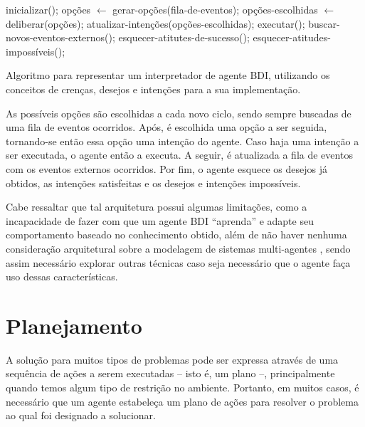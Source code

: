 \begin{algorithm}[htb] \begin{center}
	\begin{algorithmic}[1] \STATE inicializar(); \STATE {} \STATE
	opções $\gets$ gerar-opções(fila-de-eventos); \STATE opções-escolhidas
	$\gets$ deliberar(opções); \STATE atualizar-intenções(opções-escolhidas);
	\STATE executar(); \STATE buscar-novos-eventos-externos(); \STATE
	esquecer-atitutes-de-sucesso(); \STATE esquecer-atitudes-impossíveis();
	\ENDWHILE \end{algorithmic} \end{center} \caption[Algoritmo para representar
	um interpretador de agente BDI.] {\label{alg:BDIINTERPRETERALG} Algoritmo
	para representar um interpretador de agente BDI, utilizando os conceitos de
	crenças, desejos e intenções para a sua implementação.} \end{algorithm}

As possíveis opções são escolhidas a cada novo ciclo, sendo sempre buscadas de
uma fila de eventos ocorridos. Após, é escolhida uma opção a ser seguida,
tornando-se então essa opção uma intenção do agente. Caso haja uma intenção a
ser executada, o agente então a executa. A seguir, é atualizada a fila de
eventos com os eventos externos ocorridos. Por fim, o agente esquece os desejos
já obtidos, as intenções satisfeitas e os desejos e intenções impossíveis.

Cabe ressaltar que tal arquitetura possui algumas limitações, como a
incapacidade de fazer com que um agente BDI ``aprenda'' e adapte seu
comportamento baseado no conhecimento obtido, além de não haver nenhuma
consideração arquitetural sobre a modelagem de sistemas multi-agentes
\cite{Georgeff:1998:BMA:648205.749450}, sendo assim necessário explorar
outras técnicas caso seja necessário que o agente faça uso dessas
características.

\section{Planejamento}

A solução para muitos tipos de problemas pode ser expressa através de uma
sequência de ações a serem executadas -- isto é, um plano --, principalmente
quando temos algum tipo de restrição no ambiente. Portanto, em muitos casos, é
necessário que um agente estabeleça um plano de ações para resolver o problema
ao qual foi designado a solucionar.

